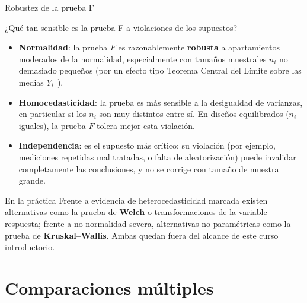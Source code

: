 \documentclass[aspectratio=169,11pt]{beamer}
\begin{document}
\begin{frame}{Robustez de la prueba F}
\begin{block}{¿Qué tan sensible es la prueba F a violaciones de los supuestos?}
\begin{itemize}
\item \textbf{Normalidad}: la prueba $F$ es razonablemente \textbf{robusta} a apartamientos moderados de la normalidad, especialmente con tamaños muestrales $n_i$ no demasiado pequeños (por un efecto tipo Teorema Central del Límite sobre las medias $\bar Y_{i\cdot}$).
\item \textbf{Homocedasticidad}: la prueba es más sensible a la desigualdad de varianzas, en particular si los $n_i$ son muy distintos entre sí. En diseños equilibrados ($n_i$ iguales), la prueba $F$ tolera mejor esta violación.
\item \textbf{Independencia}: es el supuesto más crítico; su violación (por ejemplo, mediciones repetidas mal tratadas, o falta de aleatorización) puede invalidar completamente las conclusiones, y no se corrige con tamaño de muestra grande.
\end{itemize}
\end{block}

\begin{alertblock}{En la práctica}
Frente a evidencia de heterocedasticidad marcada existen alternativas como la prueba de \textbf{Welch} o transformaciones de la variable respuesta; frente a no-normalidad severa, alternativas no paramétricas como la prueba de \textbf{Kruskal--Wallis}. Ambas quedan fuera del alcance de este curso introductorio.
\end{alertblock}
\end{frame}

\section{Comparaciones múltiples}
\end{document}

